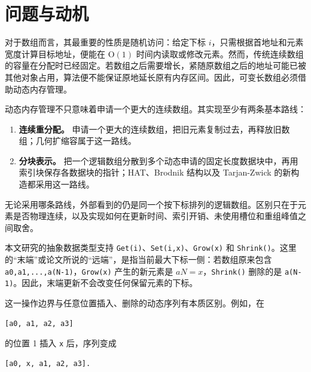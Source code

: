 \documentclass[UTF8,11pt,a4paper]{ctexart}
\begin{document}
\section{问题与动机}

对于数组而言，其最重要的性质是随机访问：给定下标 $i$，只需根据首地址和元素宽度计算目标地址，便能在 $\mathrm{O}(1)$ 时间内读取或修改元素。然而，传统连续数组的容量在分配时已经固定。若数组之后需要增长，紧随原数组之后的地址可能已被其他对象占用，算法便不能保证原地延长原有内存区间。因此，可变长数组必须借助动态内存管理。\par

动态内存管理不只意味着申请一个更大的连续数组。其实现至少有两条基本路线：\par

\begin{enumerate}
\item \textbf{连续重分配。} 申请一个更大的连续数组，把旧元素复制过去，再释放旧数组；几何扩缩容属于这一路线。
\item \textbf{分块表示。} 把一个逻辑数组分散到多个动态申请的固定长度数据块中，再用索引块保存各数据块的指针；HAT、Brodnik 结构以及 Tarjan-Zwick 的新构造都采用这一路线。
\end{enumerate}

无论采用哪条路线，外部看到的仍是同一个按下标排列的逻辑数组。区别只在于元素是否物理连续，以及实现如何在更新时间、索引开销、未使用槽位和重组峰值之间取舍。\par

本文研究的抽象数据类型支持 \textnormal{\texttt{Get(i)}}、\textnormal{\texttt{Set(i,x)}}、\textnormal{\texttt{Grow(x)}} 和 \textnormal{\texttt{Shrink()}}。这里的“末端”或论文所说的“远端”，是指当前最大下标一侧：若数组原来包含 \textnormal{\texttt{a0,a1,...,a(N-1)}}，\textnormal{\texttt{Grow(x)}} 产生的新元素是 $aN=x$，\textnormal{\texttt{Shrink()}} 删除的是 \textnormal{\texttt{a(N-1)}}。因此，末端更新不会改变任何保留元素的下标。\par

这一操作边界与任意位置插入、删除的动态序列有本质区别。例如，在\par

\begin{Verbatim}[fontsize=\scriptsize]
[a0, a1, a2, a3]
\end{Verbatim}

的位置 1 插入 \textnormal{\texttt{x}} 后，序列变成\par

\begin{Verbatim}[fontsize=\scriptsize]
[a0, x, a1, a2, a3].
\end{Verbatim}
\end{document}
